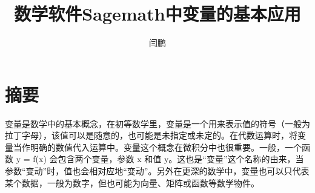 \documentclass[a4paper]{article}
\begin{document}
\title{数学软件Sagemath中变量的基本应用}
\author{闫鹏}
\date{}
\maketitle
\noindent
\section{摘要}
变量是数学中的基本概念，在初等数学里，变量是一个用来表示值的符号（一般为拉丁字母），该值可以是随意的，也可能是未指定或未定的。在代数运算时，将变量当作明确的数值代入运算中。变量这个概念在微积分中也很重要。一般，一个函数 y = f(x) 会包含两个变量，参数 x 和值 y。这也是“变量”这个名称的由来，当参数“变动”时，值也会相对应地“变动”。另外在更深的数学中，变量也可以只代表某个数据，一般为数字，但也可能为向量、矩阵或函数等数学物件。%
\end{document}
